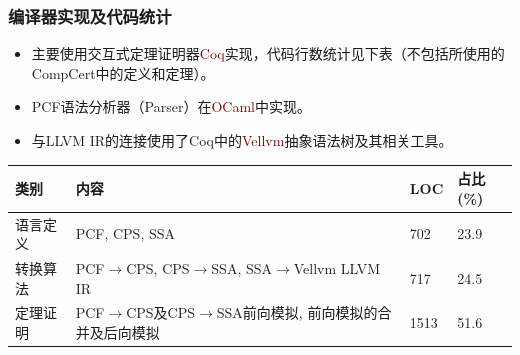 \begin{frame}
    \frametitle{编译器实现及代码统计}
    \begin{itemize}
        \item 主要使用交互式定理证明器\textcolor{Maroon}{Coq}实现，代码行数统计见下表（不包括所使用的CompCert中的定义和定理）。
        \item PCF语法分析器（Parser）在\textcolor{Maroon}{OCaml}中实现。
        \item 与LLVM IR的连接使用了Coq中的\textcolor{Maroon}{Vellvm}抽象语法树及其相关工具。
    \end{itemize}
    \vspace{1ex}
    
    \begin{table}
        \linespread{1.25}
        \scriptsize
        \centering
        \begin{center}
        \begin{tabular}{|l|l|l|l|}
        \hline
        类别 & 内容 & LOC & 占比(\%) \\
        \hline
        语言定义 & PCF, CPS, SSA & 702 & 23.9 \\
        \hline
        转换算法 & \makecell[l]{PCF$\rightarrow$CPS, CPS$\rightarrow$SSA,\\SSA$\rightarrow$Vellvm LLVM IR}  & 717 & 24.5 \\
        \hline
        定理证明 & \makecell[l]{PCF$\rightarrow$CPS及CPS$\rightarrow$SSA前向模拟,\\ 前向模拟的合并及后向模拟} & 1513 & 51.6 \\
        \hline
        \end{tabular}
        \end{center}
\end{table}
\end{frame}